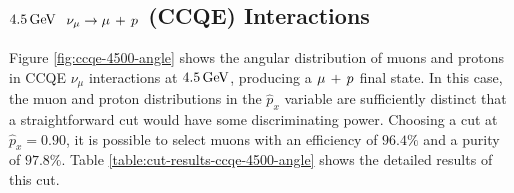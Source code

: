 \subsection{$4.5\,\mathrm{GeV}$ \texorpdfstring{$\nu_\mu \rightarrow \mu\,+\,p$}{ν\_μ → μ + p} (CCQE) Interactions}
Figure \ref{fig:ccqe-4500-angle} shows the angular distribution of muons and protons in \acs{CCQE} $\nu_\mu$ interactions at $4.5\,\mathrm{GeV}$, producing a $\mu\,+\,p$ final state. In this case, the muon and proton distributions in the $\hat{p}_x$ variable are sufficiently distinct that a straightforward cut would have some discriminating power. Choosing a cut at $\hat{p}_x = 0.90$, it is possible to select muons with an efficiency of $96.4\%$ and a purity of $97.8\%$. Table \ref{table:cut-results-ccqe-4500-angle} shows the detailed results of this cut.

\begin{figure}
    \centering
\end{figure}
